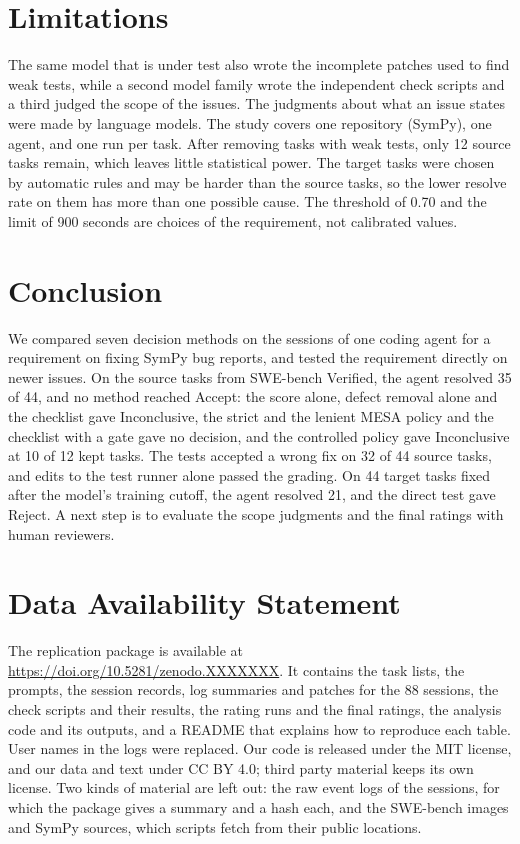\documentclass[runningheads]{llncs}
\begin{document}
\section{Limitations}
\label{sec:limitations}
The same model that is under test also wrote the incomplete patches used to find weak tests, while a second model family wrote the independent check scripts and a third judged the scope of the issues. The judgments about what an issue states were made by language models. The study covers one repository (SymPy), one agent, and one run per task. After removing tasks with weak tests, only 12 source tasks remain, which leaves little statistical power. The target tasks were chosen by automatic rules and may be harder than the source tasks, so the lower resolve rate on them has more than one possible cause. The threshold of 0.70 and the limit of 900 seconds are choices of the requirement, not calibrated values.

\section{Conclusion}
\label{sec:conclusion}
We compared seven decision methods on the sessions of one coding agent for a requirement on fixing SymPy bug reports, and tested the requirement directly on newer issues. On the source tasks from SWE-bench Verified, the agent resolved 35 of 44, and no method reached Accept: the score alone, defect removal alone and the checklist gave Inconclusive, the strict and the lenient MESA policy and the checklist with a gate gave no decision, and the controlled policy gave Inconclusive at 10 of 12 kept tasks. The tests accepted a wrong fix on 32 of 44 source tasks, and edits to the test runner alone passed the grading. On 44 target tasks fixed after the model's training cutoff, the agent resolved 21, and the direct test gave Reject. A next step is to evaluate the scope judgments and the final ratings with human reviewers.

\section*{Data Availability Statement}
The replication package is available at \url{https://doi.org/10.5281/zenodo.XXXXXXX}. It contains the task lists, the prompts, the session records, log summaries and patches for the 88 sessions, the check scripts and their results, the rating runs and the final ratings, the analysis code and its outputs, and a README that explains how to reproduce each table. User names in the logs were replaced. Our code is released under the MIT license, and our data and text under CC BY 4.0; third party material keeps its own license. Two kinds of material are left out: the raw event logs of the sessions, for which the package gives a summary and a hash each, and the SWE-bench images and SymPy sources, which scripts fetch from their public locations.



\end{document}
